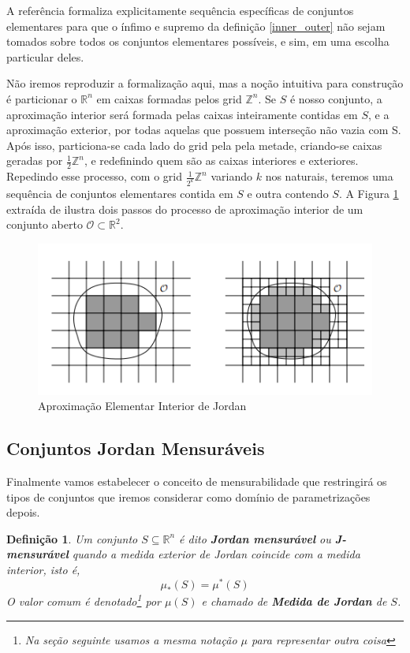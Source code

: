 \documentclass[12pt,letterpaper]{article}
\newtheorem{defi}{Definição}
\newcommand{\rr}{\mathbb{R}^2}
\newcommand{\rn}{\mathbb{R}^n}
\begin{document}
A referência \cite{math3} formaliza explicitamente sequência específicas de conjuntos elementares para que o ínfimo e supremo da definição \ref{inner_outer} não sejam tomados sobre todos os conjuntos elementares possíveis, e sim, em uma escolha particular deles.

Não iremos reproduzir a formalização aqui, mas a noção intuitiva para construção é particionar o $\rn$ em caixas formadas pelos grid $\mathbb{Z}^n$. Se $S$ é nosso conjunto, a aproximação interior será formada pelas caixas inteiramente contidas em $S$, e a aproximação exterior, por todas aquelas que possuem interseção não vazia com S. Após isso, particiona-se cada lado do grid pela pela metade, criando-se caixas geradas por $\frac12\mathbb{Z}^n$, e redefinindo quem são as caixas interiores e exteriores. Repedindo esse processo, com o grid $\frac{1}{2^k}\mathbb{Z}^n$ variando $k$ nos naturais, teremos uma sequência de conjuntos elementares contida em $S$ e outra contendo $S$. A Figura \ref{inner_jordan} extraída de \cite{princeton} ilustra dois passos do processo de aproximação interior de um conjunto aberto $\mathcal{O}\subset\rr$.

\begin{figure}[!htb]
	\centering
	\includegraphics[scale=0.95]{../images/inner_jordan.png}
	\caption{Aproximação Elementar Interior de Jordan}
	\label{inner_jordan}
\end{figure}

\subsection{Conjuntos Jordan Mensuráveis}
Finalmente vamos estabelecer o conceito de mensurabilidade que restringirá os tipos de conjuntos que iremos considerar como domínio de parametrizações depois.

\begin{defi}
	Um conjunto $S\subseteq\rn$ é dito \textbf{Jordan mensurável} ou \textbf{J-mensurável} quando a medida exterior de Jordan coincide com a medida interior, isto é,
	$$\mu_{*}(S)=\mu^{*}(S)$$
	O valor comum é denotado\footnote{Na seção seguinte usamos a mesma notação $\mu$ para representar outra coisa} por $\mu(S)$ e chamado de \textbf{Medida de Jordan} de $S$.
\end{defi}
\end{document}
